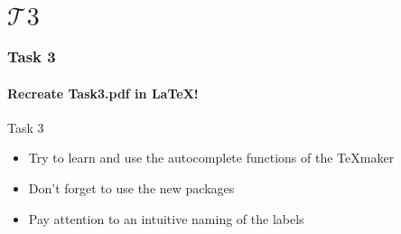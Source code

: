 \section{$\mathcal{T}3$} 
\begin{frame}
\frametitle{Task 3}
\framesubtitle{Recreate Task3.pdf in \LaTeX !} 

\begin{block}{Task 3}
\begin{itemize}
\item Try to learn and use the autocomplete functions of the \TeX maker
\item Don't forget to use the new packages
\item Pay attention to an intuitive naming of the labels
\end{itemize}
\end{block}
\end{frame}